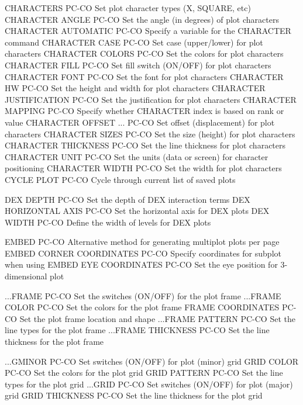 CHARACTERS                  PC-CO Set plot character types (X, SQUARE, etc)
CHARACTER ANGLE             PC-CO Set the angle (in degrees) of plot characters
CHARACTER AUTOMATIC         PC-CO Specify a variable for the CHARACTER command
CHARACTER CASE              PC-CO Set case (upper/lower) for plot characters
CHARACTER COLORS            PC-CO Set the colors for plot characters
CHARACTER FILL              PC-CO Set fill switch (ON/OFF) for plot characters
CHARACTER FONT              PC-CO Set the font for plot characters
CHARACTER HW                PC-CO Set the height and width for plot characters
CHARACTER JUSTIFICATION     PC-CO Set the justification for plot characters
CHARACTER MAPPING           PC-CO Specify whether CHARACTER index is based on rank or value
CHARACTER OFFSET ...        PC-CO Set offset (displacement) for plot characters
CHARACTER SIZES             PC-CO Set the size (height) for plot characters
CHARACTER THICKNESS         PC-CO Set the line thickness for plot characters
CHARACTER UNIT              PC-CO Set the units (data or screen) for character positioning
CHARACTER WIDTH             PC-CO Set the width for plot characters
CYCLE PLOT                  PC-CO Cycle through current list of saved plots

DEX DEPTH                   PC-CO Set the depth of DEX interaction terms
DEX HORIZONTAL AXIS         PC-CO Set the horizontal axis for DEX plots
DEX WIDTH                   PC-CO Define the width of levels for DEX plots

EMBED                       PC-CO Alternative method for generating multiplot plots per page
EMBED CORNER COORDINATES    PC-CO Specify coordinates for subplot when using EMBED
EYE COORDINATES             PC-CO Set the eye position for 3-dimensional plot

...FRAME                    PC-CO Set the switches (ON/OFF) for the plot frame
...FRAME COLOR              PC-CO Set the colors for the plot frame
FRAME COORDINATES           PC-CO Set the plot frame location and shape
...FRAME PATTERN            PC-CO Set the line types for the plot frame
...FRAME THICKNESS          PC-CO Set the line thickness for the plot frame

...GMINOR                   PC-CO Set switches (ON/OFF) for plot (minor) grid
GRID COLOR                  PC-CO Set the colors for the plot grid
GRID PATTERN                PC-CO Set the line types for the plot grid
...GRID                     PC-CO Set switches (ON/OFF) for plot (major) grid
GRID THICKNESS              PC-CO Set the line thickness for the plot grid

